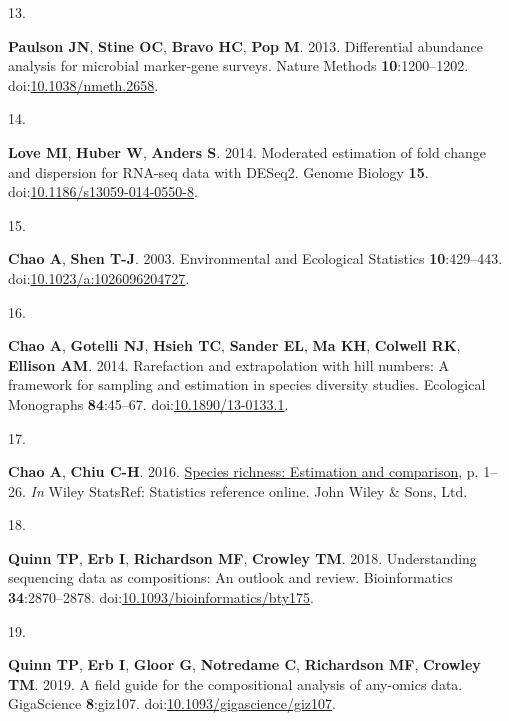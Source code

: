\documentclass[
  11pt,
]{article}
\newlength{\cslhangindent}
\newlength{\csllabelwidth}
\newenvironment{CSLReferences}[2] %
 {\begin{list}{}{%
  \setlength{\itemindent}{0pt}
  \setlength{\leftmargin}{0pt}
  \setlength{\parsep}{0pt}
  \ifodd #1
   \setlength{\leftmargin}{\cslhangindent}
   \setlength{\itemindent}{-1\cslhangindent}
  \fi
  \setlength{\itemsep}{#2\baselineskip}}}
 {\end{list}}
\newcommand{\CSLLeftMargin}[1]{\parbox[t]{\csllabelwidth}{\strut#1\strut}}
\newcommand{\CSLRightInline}[1]{\parbox[t]{\linewidth - \csllabelwidth}{\strut#1\strut}}
\begin{document}
\begin{CSLReferences}{0}{1}
\CSLLeftMargin{13. }%
\CSLRightInline{\textbf{Paulson JN}, \textbf{Stine OC}, \textbf{Bravo
HC}, \textbf{Pop M}. 2013. Differential abundance analysis for microbial
marker-gene surveys. Nature Methods \textbf{10}:1200--1202.
doi:\href{https://doi.org/10.1038/nmeth.2658}{10.1038/nmeth.2658}.}

\CSLLeftMargin{14. }%
\CSLRightInline{\textbf{Love MI}, \textbf{Huber W}, \textbf{Anders S}.
2014. Moderated estimation of fold change and dispersion for RNA-seq
data with DESeq2. Genome Biology \textbf{15}.
doi:\href{https://doi.org/10.1186/s13059-014-0550-8}{10.1186/s13059-014-0550-8}.}

\CSLLeftMargin{15. }%
\CSLRightInline{\textbf{Chao A}, \textbf{Shen T-J}. 2003. Environmental
and Ecological Statistics \textbf{10}:429--443.
doi:\href{https://doi.org/10.1023/a:1026096204727}{10.1023/a:1026096204727}.}

\CSLLeftMargin{16. }%
\CSLRightInline{\textbf{Chao A}, \textbf{Gotelli NJ}, \textbf{Hsieh TC},
\textbf{Sander EL}, \textbf{Ma KH}, \textbf{Colwell RK}, \textbf{Ellison
AM}. 2014. Rarefaction and extrapolation with hill numbers: A framework
for sampling and estimation in species diversity studies. Ecological
Monographs \textbf{84}:45--67.
doi:\href{https://doi.org/10.1890/13-0133.1}{10.1890/13-0133.1}.}

\CSLLeftMargin{17. }%
\CSLRightInline{\textbf{Chao A}, \textbf{Chiu C-H}. 2016.
\href{https://doi.org/10.1002/9781118445112.stat03432.pub2}{Species
richness: Estimation and comparison}, p. 1--26. \emph{In} Wiley
StatsRef: Statistics reference online. John Wiley \& Sons, Ltd.}

\CSLLeftMargin{18. }%
\CSLRightInline{\textbf{Quinn TP}, \textbf{Erb I}, \textbf{Richardson
MF}, \textbf{Crowley TM}. 2018. Understanding sequencing data as
compositions: An outlook and review. Bioinformatics
\textbf{34}:2870--2878.
doi:\href{https://doi.org/10.1093/bioinformatics/bty175}{10.1093/bioinformatics/bty175}.}

\CSLLeftMargin{19. }%
\CSLRightInline{\textbf{Quinn TP}, \textbf{Erb I}, \textbf{Gloor G},
\textbf{Notredame C}, \textbf{Richardson MF}, \textbf{Crowley TM}. 2019.
A field guide for the compositional analysis of any-omics data.
{GigaScience} \textbf{8}:giz107.
doi:\href{https://doi.org/10.1093/gigascience/giz107}{10.1093/gigascience/giz107}.}


\end{CSLReferences}
\end{document}
